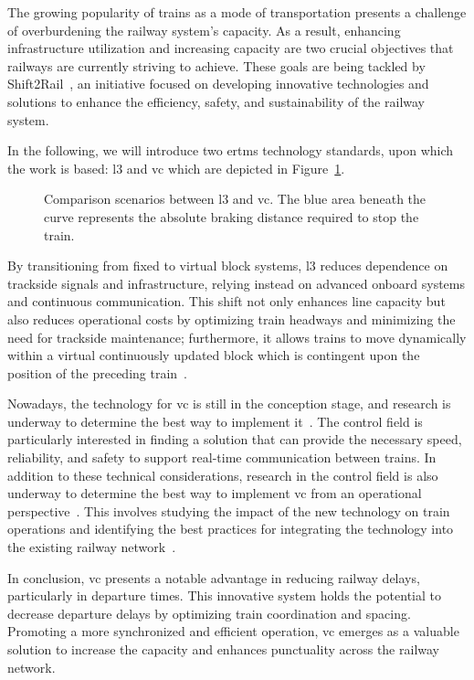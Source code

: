 \documentclass[letterpaper, 10 pt, conference]{ieeeconf}
\theoremstyle{definition}
\theoremstyle{nopoint}
\begin{document}
The growing popularity of trains as a mode of transportation presents a challenge of overburdening the railway system's capacity. As a result, enhancing infrastructure utilization and increasing capacity are two crucial objectives that railways are currently striving to achieve. These goals are being tackled by Shift2Rail~\cite{shift2rail}, an initiative focused on developing innovative technologies and solutions to enhance the efficiency, safety, and sustainability of the railway system.



In the following, we will introduce two \gls{ertms} technology standards, upon which the work is based: \gls{l3} and \gls{vc} which are depicted in Figure~\ref{fig:ertmsl3vc}.
 \begin{figure}[h]
	\resizebox{\linewidth}{!}{}
	\caption{Comparison scenarios between \gls{l3} and \gls{vc}.
		The blue area beneath the curve represents the absolute braking distance required to stop the train.}
	\label{fig:ertmsl3vc}
\end{figure} 

 By transitioning from fixed to virtual block systems, \gls{l3} reduces dependence on trackside signals and infrastructure, relying instead on advanced onboard systems and continuous  communication. This shift not only enhances line capacity but also reduces operational costs by optimizing train headways and minimizing the need for trackside maintenance; furthermore, it allows trains to move dynamically within a virtual continuously updated block which  is contingent upon the position of the preceding train~\cite{ertmsl3}.  
 



Nowadays, the technology for \gls{vc} is still in the conception stage, and research is underway to determine the best way to implement it~\cite{flamini2018}. The control field is particularly interested in finding a solution that can provide the necessary speed, reliability, and safety to support real-time communication between trains. In addition to these technical considerations, research in the control field is also underway to determine the best way to implement \gls{vc} from an operational perspective~\cite{dimeo2020}. This involves studying the impact of the new technology on train operations and identifying the best practices for integrating the technology into the existing railway network~\cite{ertmsl4}.


 In conclusion, \gls{vc} presents a notable advantage in reducing railway delays, particularly in departure times. This innovative system holds the potential to decrease departure delays by optimizing train coordination and spacing. Promoting a more synchronized and efficient operation, \gls{vc} emerges as a valuable solution to increase the capacity and enhances punctuality across the railway network.
%
\end{document}
